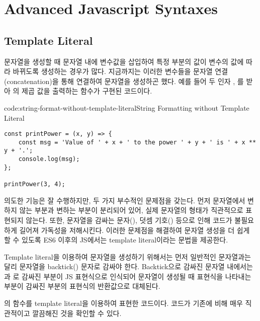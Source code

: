 \section{Advanced Javascript Syntaxes}\label{sect:advanced-javascript-syntaxes}

\subsection*{Template Literal}

문자열을 생성할 때 문자열 내에 변수값을 삽입하여 특정 부분의 값이 변수의 값에 따라 바뀌도록 생성하는 경우가 많다. 지금까지는 이러한 변수들을 문자열 연결(concatenation)을 통해 연결하여 문자열을 생성하곤 했다. 예를 들어 \은 두 인자 , 를 받아 의  제곱 값을 출력하는 함수가 구현된 코드이다.

\begin{codeenv}{code:string-format-without-template-literal}{String Formatting without Template Literal}\begin{verbatim}
const printPower = (x, y) => {
    const msg = 'Value of ' + x + ' to the power ' + y + ' is ' + x ** y + '.';
    console.log(msg);
};

printPower(3, 4);
\end{verbatim}
\end{codeenv}

\은 의도한 기능은 잘 수행하지만, 두 가지 부수적인 문제점을 갖는다. 먼저  문자열에서 변하지 않는 부분과 변하는 부분이 분리되어 있어, 실제 문자열의 형태가 직관적으로 표현되지 않는다. 또한, 문자열을 감싸는 문자(), 덧셈 기호(\cd{+}) 등으로 인해 코드가 불필요하게 길어져 가독성을 저해시킨다. 이러한 문제점을 해결하여 문자열 생성을 더 쉽게 할 수 있도록 ES6 이후의 JS에서는 template literal이라는 문법을 제공한다.

Template literal을 이용하여 문자열을 생성하기 위해서는 먼저 일반적인 문자열과는 달리 문자열을 backtick() 문자로 감싸야 한다. Backtick으로 감싸진 문자열 내에서는 \cd{\$\{}과 \cd{\}}로 감싸진 부분이 JS 표현식으로 인식되어 문자열이 생성될 때 표현식을 나타내는 부분이 감싸진 부분의 표현식의 반환값으로 대체된다.

\은 의 함수를 template literal을 이용하여 표현한 코드이다. 코드가 기존에 비해 매우 직관적이고 깔끔해진 것을 확인할 수 있다.


